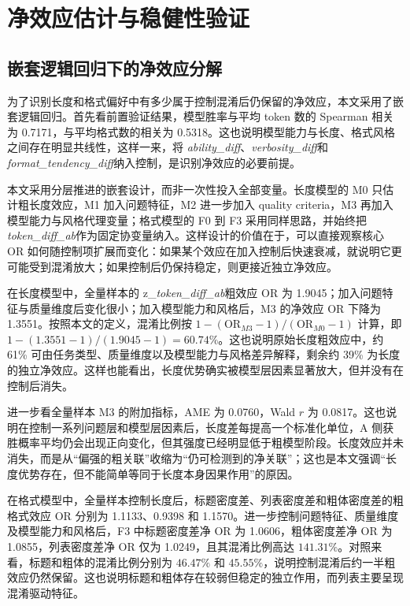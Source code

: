 \documentclass[9pt,a4paper,fontset=windows]{ctexart}
\theoremstyle{definition}
\numberwithin{equation}{section}
\newcommand{\tokendiff}{\textit{token\_diff\_ab}}
\newcommand{\ability}{\textit{ability\_diff}}
\newcommand{\verbosity}{\textit{verbosity\_diff}}
\newcommand{\formatt}{\textit{format\_tendency\_diff}}
\begin{document}
\section{净效应估计与稳健性验证}

\subsection{嵌套逻辑回归下的净效应分解}
为了识别长度和格式偏好中有多少属于控制混淆后仍保留的净效应，本文采用了嵌套逻辑回归。首先看前置验证结果，模型胜率与平均 token 数的 Spearman 相关为 0.7171，与平均格式数的相关为 0.5318。这也说明模型能力与长度、格式风格之间存在明显共线性，这样一来，将 \ability、\verbosity 和 \formatt 纳入控制，是识别净效应的必要前提。

本文采用分层推进的嵌套设计，而非一次性投入全部变量。长度模型的 M0 只估计粗长度效应，M1 加入问题特征，M2 进一步加入 quality criteria，M3 再加入模型能力与风格代理变量；格式模型的 F0 到 F3 采用同样思路，并始终把 \tokendiff 作为固定协变量纳入。这样设计的价值在于，可以直接观察核心 OR 如何随控制项扩展而变化：如果某个效应在加入控制后快速衰减，就说明它更可能受到混淆放大；如果控制后仍保持稳定，则更接近独立净效应。

在长度模型中，全量样本的 z\_\tokendiff 粗效应 OR 为 1.9045；加入问题特征与质量维度后变化很小；加入模型能力和风格后，M3 的净效应 OR 下降为 1.3551。按照本文的定义，混淆比例按 \(1-(\mathrm{OR}_{M3}-1)/(\mathrm{OR}_{M0}-1)\) 计算，即 \(1-(1.3551-1)/(1.9045-1)=60.74\%\)。这也说明原始长度粗效应中，约 61\% 可由任务类型、质量维度以及模型能力与风格差异解释，剩余约 39\% 为长度的独立净效应。这样也能看出，长度优势确实被模型层因素显著放大，但并没有在控制后消失。

进一步看全量样本 M3 的附加指标，AME 为 0.0760，Wald \(r\) 为 0.0817。这也说明在控制一系列问题层和模型层因素后，长度差每提高一个标准化单位，A 侧获胜概率平均仍会出现正向变化，但其强度已经明显低于粗模型阶段。长度效应并未消失，而是从“偏强的粗关联”收缩为“仍可检测到的净关联”；这也是本文强调“长度优势存在，但不能简单等同于长度本身因果作用”的原因。

在格式模型中，全量样本控制长度后，标题密度差、列表密度差和粗体密度差的粗格式效应 OR 分别为 1.1133、0.9398 和 1.1570。进一步控制问题特征、质量维度及模型能力和风格后，F3 中标题密度差净 OR 为 1.0606，粗体密度差净 OR 为 1.0855，列表密度差净 OR 仅为 1.0249，且其混淆比例高达 \(141.31\%\)。对照来看，标题和粗体的混淆比例分别为 \(46.47\%\) 和 \(45.55\%\)，说明控制混淆后约一半粗效应仍然保留。这也说明标题和粗体存在较弱但稳定的独立作用，而列表主要呈现混淆驱动特征。
\end{document}
